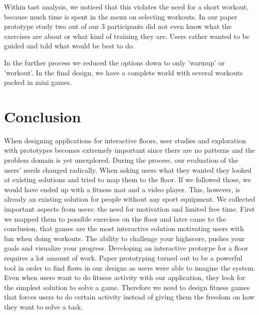 \documentclass{sigchi}
\begin{document}
    Within tast analysis, we noticed that this violates the need for a short workout, because much time is spent in the menu on selecting workouts. In our paper  prototype study two out of our 3 participants did not even know what the exercises are about or what kind of training they are. Users rather wanted to be     guided and told what would be best to do.

    In the further process we reduced the options down to only 'warmup' or 'workout'. In the final design, we have a complete world with several workouts packed  in mini games.


\section{Conclusion}

  When designing applications for interactive floors, user studies and exploration with prototypes becomes extremely important since there are no patterns and the problem domain is yet unexplored. During the process, our evaluation of the users' needs changed radically. When asking users what they wanted they looked at existing solutions and tried to map them to the floor. If we followed those, we would have ended up with a fitness mat and a video player. This, however, is already an existing solution for people without any sport equipment. We collected important aspects from users: the need for motivation and limited free time. First we mapped them to possible exercises on the floor and later came to the conclusion, that games are the most interactive solution motivating users with fun when doing workouts. The ability to challenge your highscore, pushes your goals and visualize your progress. 
  Developing an interactive protoype for a floor requires a lot amount of work. Paper prototyping turned out to be a powerful tool in order to find flaws in our designs as users were able to imagine the system.
  Even when users want to do fitness activity with our application, they look for the simplest solution to solve a game. Therefore we need to design fitness games that forces users to do certain activity instead of giving them the freedom on how they want to solve a task.
\end{document}
